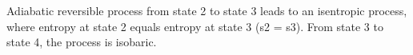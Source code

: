 Adiabatic reversible process from state 2 to state 3 leads to an isentropic process, where entropy at state 2 equals entropy at state 3 (s2 = s3).  
From state 3 to state 4, the process is isobaric.